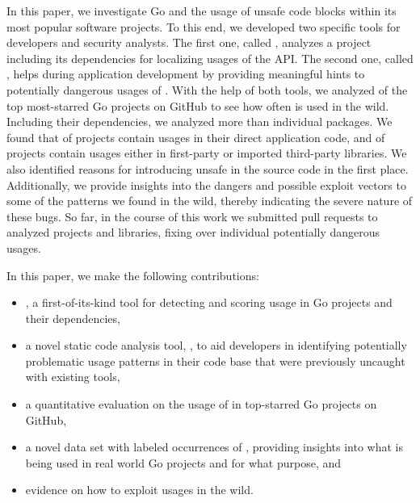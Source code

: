 In this paper, we investigate Go and the usage of unsafe code blocks within its most popular software projects. 
To this end, we developed two specific tools for developers and security analysts.
The first one, called \toolUsage{}, analyzes a project including its dependencies for localizing usages of the \unsafe{} API. %
The second one, called \toolSA{}, helps during application development by providing meaningful hints to potentially dangerous usages of \unsafe{}.
With the help of both tools, we analyzed \projsAnalyzed{} of the top \initalProjs{} most-starred Go projects on GitHub to see how often \unsafe{} is used in the wild. 
Including their dependencies, we analyzed more than \packagesAnalyzedRounded{} individual packages. %
We found that \percentageProjectsWithUnsafe{} of projects contain \unsafe{} usages in their direct application code, and \percentageProjectsAndDependenciesUnsafe{} of
projects contain \unsafe{} usages either in first-party or imported third-party libraries.
We also identified reasons for introducing unsafe in the source code in the first place. 
Additionally, we provide insights into the dangers and possible exploit vectors to some of the patterns we found in the wild, thereby indicating the severe nature of these bugs.
So far, in the course of this work we submitted \numberPRs{} pull requests to analyzed projects and libraries, fixing over \numberBugsFixed{} individual potentially dangerous \unsafe{} usages.

In this paper, we make the following contributions:

\begin{itemize}
\item \toolUsage{}, a first-of-its-kind tool for detecting and scoring \unsafe{} usage in Go projects and their dependencies,
\item a novel static code analysis tool, \toolSA{}, to aid developers in identifying potentially problematic \unsafe{} usage patterns in their code base that were previously uncaught with existing tools,
\item a quantitative evaluation on the usage of \unsafe{} in \projsAnalyzed{} top-starred Go projects on GitHub,
\item a novel data set with  labeled occurrences of \unsafe{}, providing insights into what is being used in real world Go projects and for what purpose, and
\item evidence on how to exploit \unsafe{} usages in the wild.
\end{itemize}


